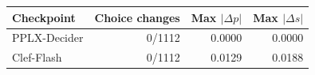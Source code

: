 \begin{tabular}{lrrr}
\toprule
Checkpoint & Choice changes & Max $|\Delta p|$ & Max $|\Delta s|$ \\
\midrule
PPLX-Decider & 0/1112 & 0.0000 & 0.0000 \\
Clef-Flash & 0/1112 & 0.0129 & 0.0188 \\
\bottomrule
\end{tabular}
